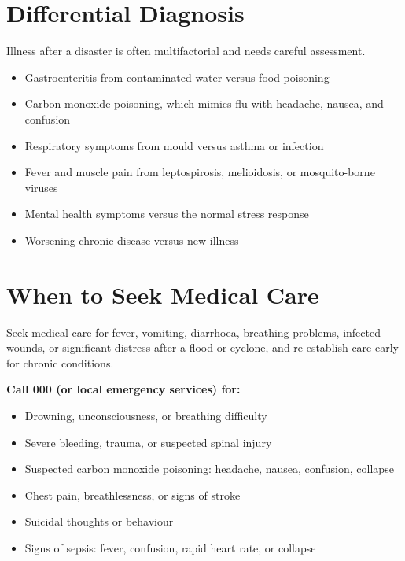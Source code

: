\section*{Differential Diagnosis}
Illness after a disaster is often multifactorial and needs careful assessment.
\begin{itemize}
    \item Gastroenteritis from contaminated water versus food poisoning
    \item Carbon monoxide poisoning, which mimics flu with headache, nausea, and confusion
    \item Respiratory symptoms from mould versus asthma or infection
    \item Fever and muscle pain from leptospirosis, melioidosis, or mosquito-borne viruses
    \item Mental health symptoms versus the normal stress response
    \item Worsening chronic disease versus new illness
\end{itemize}

\section*{When to Seek Medical Care}
Seek medical care for fever, vomiting, diarrhoea, breathing problems, infected wounds, or significant distress after a flood or cyclone, and re-establish care early for chronic conditions.

\textbf{Call 000 (or local emergency services) for:}
\begin{itemize}
    \item Drowning, unconsciousness, or breathing difficulty
    \item Severe bleeding, trauma, or suspected spinal injury
    \item Suspected carbon monoxide poisoning: headache, nausea, confusion, collapse
    \item Chest pain, breathlessness, or signs of stroke
    \item Suicidal thoughts or behaviour
    \item Signs of sepsis: fever, confusion, rapid heart rate, or collapse
\end{itemize}

